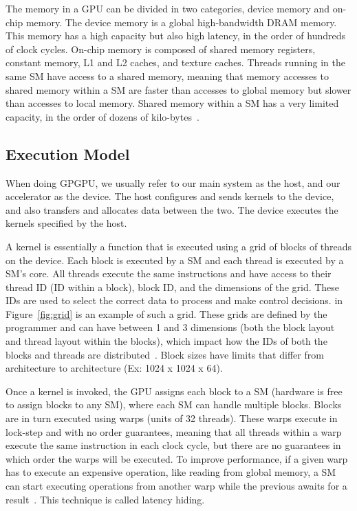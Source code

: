 The memory in a \gls{GPU} can be divided in two categories, device memory and on-chip memory. The device memory is a global high-bandwidth \gls{DRAM} memory. This memory has a high capacity but also high latency, in the order of hundreds of clock cycles. On-chip memory is composed of shared memory registers, constant memory, L1 and L2 caches, and texture caches. Threads running in the same \gls{SM} have access to a shared memory, meaning that memory accesses to shared memory within a \gls{SM} are faster than accesses to global memory but slower than accesses to local memory. Shared memory within a \gls{SM} has a very limited capacity, in the order of dozens of kilo-bytes~\cite{survery:graph_processing_on_gpu}.

\subsection{Execution Model}
\label{sec:execution_model}

When doing \gls{GPGPU}, we usually refer to our main system as the host, and our accelerator as the device. The host configures and sends kernels to the device, and also transfers and allocates data between the two. The device executes the kernels specified by the host.

A kernel is essentially a function that is executed using a grid of blocks of threads on the device. Each block is executed by a \gls{SM} and each thread is executed by a \gls{SM}'s core. All threads execute the same instructions and have access to their thread ID (ID within a block), block ID, and the dimensions of the grid. These IDs are used to select the correct data to process and make control decisions. in Figure~\ref{fig:grid} is an example of such a grid. These grids are defined by the programmer and can have between 1 and 3 dimensions (both the block layout and thread layout within the blocks), which impact how the IDs of both the blocks and threads are distributed~\cite{survery:graph_processing_on_gpu}. Block sizes have limits that differ from architecture to architecture (Ex: 1024 x 1024 x 64).

Once a kernel is invoked, the \gls{GPU} assigns each block to a \gls{SM} (hardware is free to assign blocks to any \gls{SM}), where each \gls{SM} can handle multiple blocks. Blocks are in turn executed using warps (units of 32 threads). These warps execute in lock-step and with no order guarantees, meaning that all threads within a warp execute the same instruction in each clock cycle, but there are no guarantees in which order the warps will be executed. To improve performance, if a given warp has to execute an expensive operation, like reading from global memory, a \gls{SM} can start executing operations from another warp while the previous awaits for a result~\cite{site:nvidiaCudaGuide}. This technique is called latency hiding.

